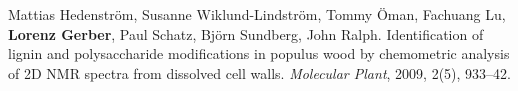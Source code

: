 \documentclass[10pt]{article}
\renewcommand{\section}[1]{\pagebreak[3]%
                                 \hyphenpenalty=10000%
                                 \vspace{1.3\baselineskip}%
                                 \phantomsection\addcontentsline{toc}{section}{#1}%
                                 \noindent\llap{\scshape\smash{\parbox[t]{\marginparwidth}{\raggedright #1}}}%
                                 \vspace{-\baselineskip}\par}
\begin{document}
\begin{bibenum}
                                                                                           \item Mattias Hedenstr\"{o}m, Susanne Wiklund-Lindstr\"{o}m,
                                                                                             Tommy \"{O}man, Fachuang Lu, \textbf{Lorenz Gerber},
                                                                                             Paul Schatz, Bj\"{o}rn Sundberg, John Ralph.
                                                                                             Identification of lignin and polysaccharide modifications
                                                                                             in populus wood by chemometric analysis of 2D NMR spectra
                                                                                             from dissolved cell walls. \emph{Molecular Plant}, 2009, 2(5), 933--42.\\


                                                                                           \end{bibenum}






\end{document}
